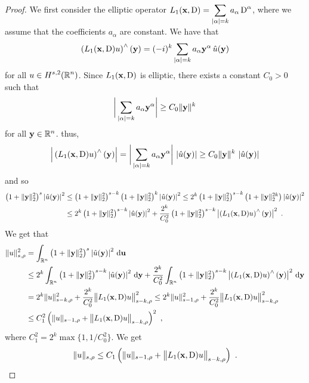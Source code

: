 \begin{proof}
 We first consider the elliptic operator
$\displaystyle L_1(\mathbf{x},\operatorname{D}) = \sum_{|\alpha|= k} a_\alpha \operatorname{D}^\alpha$,
where we assume that the coefficients $a_\alpha$ are constant.  We
have that
\[
 \left(L_1(\mathbf{x},\operatorname{D}) u \right)^\wedge(\mathbf{y})
= (-i)^k \sum_{|\alpha|= k} a_\alpha \mathbf{y}^\alpha \,
\hat{u}(\mathbf{y})
\]
for all $\displaystyle u \in H^{s,2}(\mathbb{R}^n)$.  Since
$L_1(\mathbf{x},\operatorname{D})$ is elliptic, there exists a constant $C_0>0$ such that
\[
\bigg|\sum_{|\alpha|= k} a_\alpha \mathbf{y}^\alpha\bigg| \geq  C_0 \|\mathbf{y}\|^k
\]
for all $\mathbf{y} \in \mathbb{R}^n$.  thus,
\[
 \Big| \left(L_1(\mathbf{x},\operatorname{D}) u \right)^\wedge(\mathbf{y}) \Big|
= \bigg|\sum_{|\alpha|= k} a_\alpha \mathbf{y}^\alpha \bigg| \,
\left|\hat{u}(\mathbf{y})\right|
\geq C_0 \|\mathbf{y}\|^k \, \left|\hat{u}(\mathbf{y})\right|
\]
and so
\begin{align*}
\left(1 + \|\mathbf{y}\|_2^2\right)^s \left| \hat{u}(\mathbf{y})\right|^2
&\leq \left(1 + \|\mathbf{y}\|_2^2\right)^{s-k}
\left(1 + \|\mathbf{y}\|_2^2\right)^k \left| \hat{u}(\mathbf{y})\right|^2
\leq 2^k \left(1 + \|\mathbf{y}\|_2^2\right)^{s-k}
\left(1 + \|\mathbf{y}\|_2^{2k}\right) \left| \hat{u}(\mathbf{y})\right|^2 \\
&\leq 2^k \left(1 + \|\mathbf{y}\|_2^2\right)^{s-k}
\left| \hat{u}(\mathbf{y})\right|^2
+ \frac{2^k}{C_0^2} \left(1 + \|\mathbf{y}\|_2^2\right)^{s-k}
\left| \left(L_1(\mathbf{x},\operatorname{D}) u\right)^\wedge(\mathbf{y})\right|^2 \ .
\end{align*}
We get that
\begin{align*}
\|u\|_{s,\rho}^2
&= \int_{\mathbb{R}^n}\left(1 + \|\mathbf{y}\|_2^2\right)^s
\left| \hat{u}(\mathbf{y})\right|^2 \,\mathrm{d}{\mathbf{u}} \\
&\leq 2^k \int_{\mathbb{R}^n}
\left(1 + \|\mathbf{y}\|_2^2\right)^{s-k}
\left| \hat{u}(\mathbf{y})\right|^2 \,\mathrm{d}{\mathbf{y}}
+ \frac{2^k}{C_0^2} \int_{\mathbb{R}^n} \left(1 + \|\mathbf{y}\|_2^2\right)^{s-k}
\left| \left(L_1(\mathbf{x},\operatorname{D}) u\right)^\wedge(\mathbf{y})\right|^2
\,\mathrm{d}{\mathbf{y}} \\
&= 2^k \|u\|_{s-k,\rho}^2
+ \frac{2^k}{C_0^2} \big\|L_1(\mathbf{x},\operatorname{D})u\big\|_{s-k,\rho}^2
\leq 2^k \|u\|_{s-1,\rho}^2
+ \frac{2^k}{C_0^2} \big\|L_1(\mathbf{x},\operatorname{D})u\big\|_{s-k,\rho}^2 \\
&\leq C_1^2 \left( \|u\|_{s-1,\rho} +
\big\|L_1(\mathbf{x},\operatorname{D})u\big\|_{s-k,\rho}\right)^2 \ ,
\end{align*}
where $\displaystyle C_1^2 = 2^k \max\{1,1/C_0^2\}$.  We get
\begin{equation} \label{ellRegInEq1}
\|u\|_{s,\rho} \leq C_1 \left( \|u\|_{s-1,\rho} +
\big\|L_1(\mathbf{x},\operatorname{D})u\big\|_{s-k,\rho}\right) \ .
\end{equation}


\end{proof}
